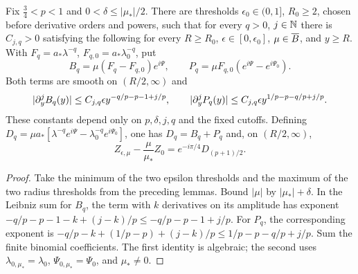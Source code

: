 \begin{lemma}
  \label{lem:c04_Z_difference_products}
  Fix $\frac34<p<1$ and $0<\delta\le|\mu_*|/2$.
  There are thresholds $\epsilon_0\in(0,1]$, $R_0\ge2$, chosen before derivative
  orders and powers, such that for every $q>0$, $j\in\mathbb{N}$ there is $C_{j,q}>0$
  satisfying the following for every $R\ge R_0$, $\epsilon\in[0,\epsilon_0]$,
  $\mu\in\overline{B}$, and $y\ge R$.
  With $F_q=a_*\lambda^{-q}$, $F_{q,0}=a_*\lambda_0^{-q}$, put
  \[
    B_q=\mu(F_q-F_{q,0})e^{i\Psi},\qquad
    P_q=\mu F_{q,0}(e^{i\Psi}-e^{i\Psi_0}).
  \]
  Both terms are smooth on $(R/2,\infty)$ and
  \[
    |\partial_y^jB_q(y)|\le C_{j,q}\epsilon y^{-q/p-p-1+j/p},\qquad
    |\partial_y^jP_q(y)|\le C_{j,q}\epsilon y^{1/p-p-q/p+j/p}.
  \]
  These constants depend only on $p,\delta,j,q$ and the fixed cutoffs.
  Defining $D_q=\mu a_*[\lambda^{-q}e^{i\Psi}-\lambda_0^{-q}e^{i\Psi_0}]$, one has
  $D_q=B_q+P_q$ and, on $(R/2,\infty)$,
  \[
    Z_{\epsilon,\mu}-\frac\mu{\mu_*}Z_0=e^{-i\pi/4}D_{(p+1)/2}.
  \]
\end{lemma}
\begin{proof}
  Take the minimum of the two epsilon thresholds and the maximum of the two radius
  thresholds from the preceding lemmas. Bound $|\mu|$ by $|\mu_*|+\delta$.
  In the Leibniz sum for $B_q$, the term with $k$ derivatives on its amplitude has
  exponent $-q/p-p-1-k+(j-k)/p\le-q/p-p-1+j/p$.
  For $P_q$, the corresponding exponent is
  $-q/p-k+(1/p-p)+(j-k)/p\le1/p-p-q/p+j/p$.
  Sum the finite binomial coefficients. The first identity is algebraic; the second uses
  $\lambda_{0,\mu_*}=\lambda_0$, $\Psi_{0,\mu_*}=\Psi_0$, and $\mu_*\ne0$.
\end{proof}

